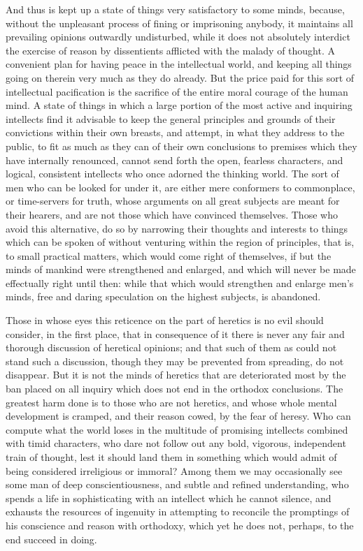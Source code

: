 \documentclass[11pt,openany]{book}
\begin{document}
And thus is kept up a state of things very satisfactory to some minds, because, without the unpleasant process of fining or imprisoning anybody, it maintains all prevailing opinions outwardly undisturbed, while it does not absolutely interdict the exercise of reason by dissentients afflicted with the malady of thought. A convenient plan for having peace in the intellectual world, and keeping all things going on therein very much as they do already. But the price paid for this sort of intellectual pacification is the sacrifice of the entire moral courage of the human mind. A state of things in which a large portion of the most active and inquiring intellects find it advisable to keep the general principles and grounds of their convictions within their own breasts, and attempt, in what they address to the public, to fit as much as they can of their own conclusions to premises which they have internally renounced, cannot send forth the open, fearless characters, and logical, consistent intellects who once adorned the thinking world. The sort of men who can be looked for under it, are either mere conformers to commonplace, or time-servers for truth, whose arguments on all great subjects are meant for their hearers, and are not those which have convinced themselves. Those who avoid this alternative, do so by narrowing their thoughts and interests to things which can be spoken of without venturing within the region of principles, that is, to small practical matters, which would come right of themselves, if but the minds of mankind were strengthened and enlarged, and which will never be made effectually right until then: while that which would strengthen and enlarge men's minds, free and daring speculation on the highest subjects, is abandoned.

Those in whose eyes this reticence on the part of heretics is no evil should consider, in the first place, that in consequence of it there is never any fair and thorough discussion of heretical opinions; and that such of them as could not stand such a discussion, though they may be prevented from spreading, do not disappear. But it is not the minds of heretics that are deteriorated most by the ban placed on all inquiry which does not end in the orthodox conclusions. The greatest harm done is to those who are not heretics, and whose whole mental development is cramped, and their reason cowed, by the fear of heresy. Who can compute what the world loses in the multitude of promising intellects combined with timid characters, who dare not follow out any bold, vigorous, independent train of thought, lest it should land them in something which would admit of being considered irreligious or immoral? Among them we may occasionally see some man of deep conscientiousness, and subtle and refined understanding, who spends a life in sophisticating with an intellect which he cannot silence, and exhausts the resources of ingenuity in attempting to reconcile the promptings of his conscience and reason with orthodoxy, which yet he does not, perhaps, to the end succeed in doing.
\end{document}
